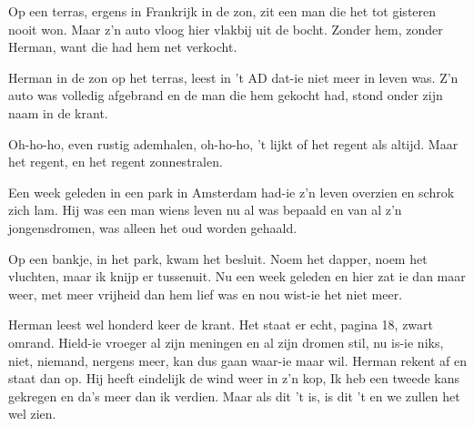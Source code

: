 \begin{verse*}
Op een terras, ergens in Frankrijk in de zon,
zit een man die het tot gisteren nooit won.
Maar z'n auto vloog hier vlakbij uit de bocht.
Zonder hem, zonder Herman, want die had hem net verkocht.
\end{verse*}

\begin{verse*}
Herman in de zon op het terras,
leest in 't AD dat-ie niet meer in leven was.
Z'n auto was volledig afgebrand
en de man die hem gekocht had, stond onder zijn naam in de krant.
\end{verse*}

\begin{chorus}
Oh-ho-ho, even rustig ademhalen,
oh-ho-ho, 't lijkt of het regent als altijd.
Maar het regent, en het regent zonnestralen.
\end{chorus}

\begin{verse*}
Een week geleden in een park in Amsterdam
had-ie z'n leven overzien en schrok zich lam.
Hij was een man wiens leven nu al was bepaald
en van al z'n jongensdromen, was alleen het oud worden gehaald.
\end{verse*}

\thechorus

\begin{verse*}
Op een bankje, in het park, kwam het besluit.
Noem het dapper, noem het vluchten, maar ik knijp er tussenuit.
Nu een week geleden en hier zat ie dan maar weer,
met meer vrijheid dan hem lief was en nou wist-ie het niet meer.
\end{verse*}

\begin{verse*}
Herman leest wel honderd keer de krant.
Het staat er echt, pagina 18, zwart omrand.
Hield-ie vroeger al zijn meningen en al zijn dromen stil,
nu is-ie niks, niet, niemand, nergens meer,
kan dus gaan waar-ie maar wil.
Herman rekent af en staat dan op.
Hij heeft eindelijk de wind weer in z'n kop,
Ik heb een tweede kans gekregen en da's meer dan ik verdien.
Maar als dit 't is, is dit 't 
en we zullen het wel zien.
\end{verse*}

\thechorus[2]
